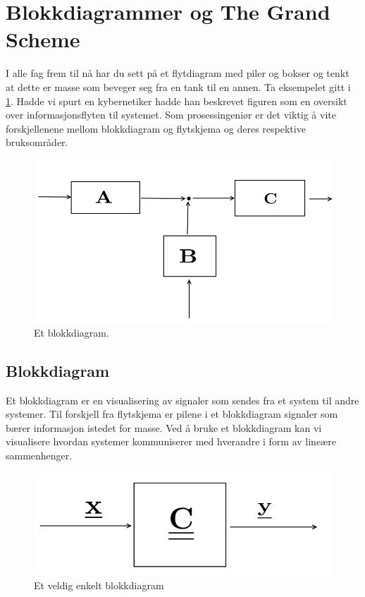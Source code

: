 \clearpage
\section{Blokkdiagrammer og The Grand Scheme}\label{sec:signal_block_diagram}
I alle fag frem til nå har du sett på et flytdiagram med piler og bokser og tenkt at dette er masse som beveger seg fra en tank til en annen. Ta eksempelet gitt i \cref{fig:simple_blockdiagram}. Hadde vi spurt en kybernetiker hadde han beskrevet figuren som en oversikt over informasjonsflyten til systemet. Som prosessingeniør er det viktig å vite forskjellenene mellom blokkdiagram og flytskjema og deres respektive bruksområder.

\begin{figure}[H]
    \centering
    \includegraphics[scale=0.5]{Figures/simple_blockdiagram1.png}
    \caption{Et blokkdiagram.}
    \label{fig:simple_blockdiagram}
\end{figure}

\subsection{Blokkdiagram}
Et blokkdiagram er en visualisering av signaler som sendes fra et system til andre systemer. Til forskjell fra flytskjema er pilene i et blokkdiagram signaler som bærer informasjon istedet for masse. Ved å bruke et blokkdiagram kan vi visualisere hvordan systemer kommuniserer med hverandre i form av lineære sammenhenger.

\begin{figure}[H]
    \centering
    \includegraphics[scale=0.5]{Figures/very_simple_blockdiagram.png}
    \caption{Et veldig enkelt blokkdiagram}
    \label{fig:very_simple_blockdiagram}
\end{figure}

